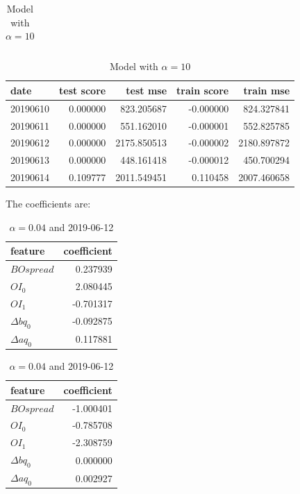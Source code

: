 \documentclass[english, 11pt, a4paper]{article}
\begin{document}
\begin{table}[H]
\begin{minipage}{.6\textwidth}
\begin{tabular}{lrrrr}
    \end{tabular}
    \caption{Model with $\alpha = 1$}
  \end{minipage}
  \begin{minipage}{.6\textwidth}
    \centering
    \begin{tabular}{lrrrr}
    \toprule
    date & test score & test mse & train score & train mse \\
    \midrule
    20190610 & 0.000000 & 823.205687 & -0.000000 & 824.327841 \\
    20190611 & 0.000000 & 551.162010 & -0.000001 & 552.825785 \\
    20190612 & 0.000000 & 2175.850513 & -0.000002 & 2180.897872 \\
    20190613 & 0.000000 & 448.161418 & -0.000012 & 450.700294 \\
    20190614 & 0.109777 & 2011.549451 & 0.110458 & 2007.460658 \\
    \bottomrule
    \end{tabular}
    \caption{Model with $\alpha = 10$}
    \end{minipage}
\end{table}

The coefficients are:


\begin{table}[H]
  \centering
  \begin{minipage}{.4\textwidth}
    \centering
      \begin{tabular}{lr}
      \toprule
      feature & coefficient \\
      \midrule
      $BOspread$ & 0.237939 \\
      $OI_0$ & 2.080445 \\
      $OI_1$ & -0.701317 \\
      $\Delta bq_{0}$ & -0.092875 \\
      $\Delta aq_{0}$ & 0.117881 \\
      \bottomrule
      \end{tabular}
  \caption{ $\alpha = 0.04$ and 2019-06-10}
  \end{minipage}
  \begin{minipage}{.4\textwidth}
    \centering
  \begin{tabular}{lr}
  \toprule
  feature & coefficient \\
  \midrule
  $BOspread$ & -1.000401 \\
  $OI_0$ & -0.785708 \\
  $OI_1$ & -2.308759 \\
  $\Delta bq_{0}$ & 0.000000 \\
  $\Delta aq_{0}$ & 0.002927 \\
  \bottomrule
  \end{tabular}
  \caption{ $\alpha = 0.04$ and 2019-06-12}
  \end{minipage}
\end{table}
\end{document}

